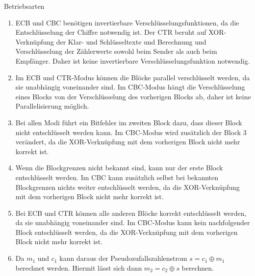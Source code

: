 \documentclass{article}
\begin{document}
\begin{exercise}{Betriebsarten}
  \begin{solution}
    \begin{enumerate}
        \item ECB und CBC benötigen invertierbare Verschlüsselungsfunktionen, da die Entschlüsselung der Chiffre notwendig ist. Der CTR beruht auf XOR-Verknüpfung der Klar- und Schlüsseltexte und Berechnung und Verschlüsselung der Zählerwerte sowohl beim Sender als auch beim Empfänger. Daher ist keine invertierbare Verschlüsselungsfunktion notwendig.
        \item Im ECB und CTR-Modus können die Blöcke parallel verschlüsselt werden, da sie unabhängig voneinander sind. Im CBC-Modus hängt die Verschlüsselung eines Blocks von der Verschlüsselung des vorherigen Blocks ab, daher ist keine Parallelisierung möglich.
        \item Bei allen Modi führt ein Bitfehler im zweiten Block dazu, dass dieser Block nicht entschlüsselt werden kann. Im CBC-Modus wird zusätzlich der Block 3 verändert, da die XOR-Verknüpfung mit dem vorherigen Block nicht mehr korrekt ist.
        \item Wenn die Blockgrenzen nicht bekannt sind, kann nur der erste Block entschlüsselt werden. Im CBC kann zusätzlich selbst bei bekannten Blockgrenzen nichts weiter entschlüsselt werden, da die XOR-Verknüpfung mit dem vorherigen Block nicht mehr korrekt ist.
        \item Bei ECB und CTR können alle anderen Blöcke korrekt entschlüsselt werden, da sie unabhängig voneinander sind. Im CBC-Modus kann kein nachfolgender Block entschlüsselt werden, da die XOR-Verknüpfung mit dem vorherigen Block nicht mehr korrekt ist.
        \item Da $m_1$ und $c_1$ kann daraus der Pseudozufallszahlenstrom $s=c_1\oplus m_1$ berechnet werden. Hiermit lässt sich dann $m_2=c_2\oplus s$ berechnen.
    \end{enumerate}
  \end{solution}
\end{exercise}
\end{document}
